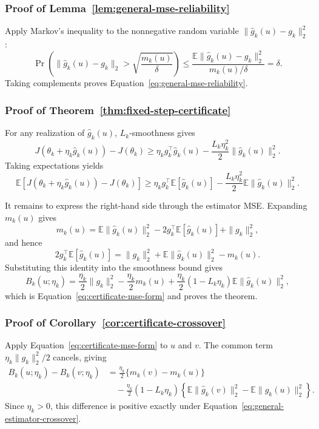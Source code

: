 \documentclass[11pt]{article}
\theoremstyle{remark}
\newcommand{\E}{\mathbb{E}}
\begin{document}
\subsubsection{Proof of Lemma~\ref{lem:general-mse-reliability}}

Apply Markov's inequality to the nonnegative random variable
$\|\widehat g_k(u)-g_k\|_2^2$:
\[
 \Pr\left(
 \|\widehat g_k(u)-g_k\|_2
 >
 \sqrt{\frac{m_k(u)}{\delta}}
 \right)
 \le
 \frac{
 \E\|\widehat g_k(u)-g_k\|_2^2
 }{
 m_k(u)/\delta
 }
 =
 \delta.
\]
Taking complements proves
Equation~\eqref{eq:general-mse-reliability}.


\subsubsection{Proof of Theorem~\ref{thm:fixed-step-certificate}}

For any realization of $\widehat g_k(u)$, $L_k$-smoothness gives
\[
 J(\theta_k+\eta_k\widehat g_k(u))-J(\theta_k)
 \ge
 \eta_k g_k^\top\widehat g_k(u)
 -
 \frac{L_k\eta_k^2}{2}
 \|\widehat g_k(u)\|_2^2.
\]
Taking expectations yields
\[
 \E\!\left[
 J(\theta_k+\eta_k\widehat g_k(u))-J(\theta_k)
 \right]
 \ge
 \eta_k g_k^\top\E[\widehat g_k(u)]
 -
 \frac{L_k\eta_k^2}{2}
 \E\|\widehat g_k(u)\|_2^2.
\]

It remains to express the right-hand side through the estimator MSE.
Expanding $m_k(u)$ gives
\[
 m_k(u)
 =
 \E\|\widehat g_k(u)\|_2^2
 -
 2g_k^\top\E[\widehat g_k(u)]
 +
 \|g_k\|_2^2,
\]
and hence
\[
 2g_k^\top\E[\widehat g_k(u)]
 =
 \|g_k\|_2^2
 +
 \E\|\widehat g_k(u)\|_2^2
 -
 m_k(u).
\]
Substituting this identity into the smoothness bound gives
\[
 B_k(u;\eta_k)
 =
 \frac{\eta_k}{2}\|g_k\|_2^2
 -
 \frac{\eta_k}{2}m_k(u)
 +
 \frac{\eta_k}{2}(1-L_k\eta_k)
 \E\|\widehat g_k(u)\|_2^2,
\]
which is Equation~\eqref{eq:certificate-mse-form} and proves the theorem.


\subsubsection{Proof of Corollary~\ref{cor:certificate-crossover}}

Apply Equation~\eqref{eq:certificate-mse-form} to $u$ and $v$. The common
term $\eta_k\|g_k\|_2^2/2$ cancels, giving
\begin{align*}
 B_k(u;\eta_k)-B_k(v;\eta_k)
 &=
 \frac{\eta_k}{2}
 \{m_k(v)-m_k(u)\}\\
 &\quad-
 \frac{\eta_k}{2}(1-L_k\eta_k)
 \left\{
 \E\|\widehat g_k(v)\|_2^2
 -
 \E\|\widehat g_k(u)\|_2^2
 \right\}.
\end{align*}
Since $\eta_k>0$, this difference is positive exactly under
Equation~\eqref{eq:general-estimator-crossover}.
\end{document}
